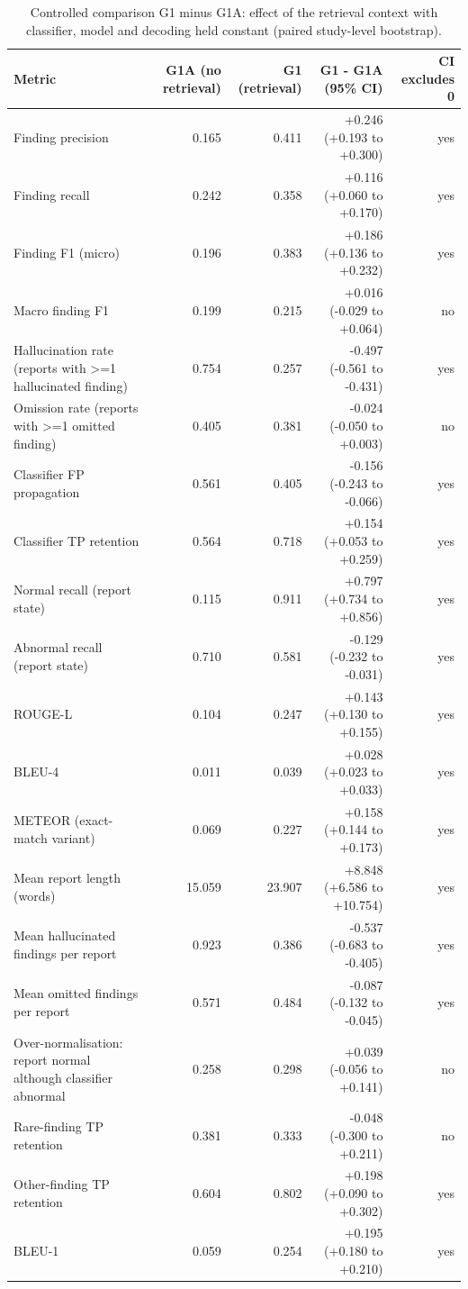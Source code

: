 \begin{table}[t]
\centering
\scriptsize
\begin{tabular}{lrrrr}
\hline
Metric & G1A (no retrieval) & G1 (retrieval) & G1 - G1A (95\% CI) & CI excludes 0 \\
\hline
Finding precision & 0.165 & 0.411 & +0.246 (+0.193 to +0.300) & yes \\
Finding recall & 0.242 & 0.358 & +0.116 (+0.060 to +0.170) & yes \\
Finding F1 (micro) & 0.196 & 0.383 & +0.186 (+0.136 to +0.232) & yes \\
Macro finding F1 & 0.199 & 0.215 & +0.016 (-0.029 to +0.064) & no \\
Hallucination rate (reports with >=1 hallucinated finding) & 0.754 & 0.257 & -0.497 (-0.561 to -0.431) & yes \\
Omission rate (reports with >=1 omitted finding) & 0.405 & 0.381 & -0.024 (-0.050 to +0.003) & no \\
Classifier FP propagation & 0.561 & 0.405 & -0.156 (-0.243 to -0.066) & yes \\
Classifier TP retention & 0.564 & 0.718 & +0.154 (+0.053 to +0.259) & yes \\
Normal recall (report state) & 0.115 & 0.911 & +0.797 (+0.734 to +0.856) & yes \\
Abnormal recall (report state) & 0.710 & 0.581 & -0.129 (-0.232 to -0.031) & yes \\
ROUGE-L & 0.104 & 0.247 & +0.143 (+0.130 to +0.155) & yes \\
BLEU-4 & 0.011 & 0.039 & +0.028 (+0.023 to +0.033) & yes \\
METEOR (exact-match variant) & 0.069 & 0.227 & +0.158 (+0.144 to +0.173) & yes \\
Mean report length (words) & 15.059 & 23.907 & +8.848 (+6.586 to +10.754) & yes \\
Mean hallucinated findings per report & 0.923 & 0.386 & -0.537 (-0.683 to -0.405) & yes \\
Mean omitted findings per report & 0.571 & 0.484 & -0.087 (-0.132 to -0.045) & yes \\
Over-normalisation: report normal although classifier abnormal & 0.258 & 0.298 & +0.039 (-0.056 to +0.141) & no \\
Rare-finding TP retention & 0.381 & 0.333 & -0.048 (-0.300 to +0.211) & no \\
Other-finding TP retention & 0.604 & 0.802 & +0.198 (+0.090 to +0.302) & yes \\
BLEU-1 & 0.059 & 0.254 & +0.195 (+0.180 to +0.210) & yes \\
\hline
\end{tabular}
\caption{Controlled comparison G1 minus G1A: effect of the retrieval context with classifier, model and decoding held constant (paired study-level bootstrap).}
\label{tab:table2_g1_minus_g1a_controlled_comparison}
\end{table}
